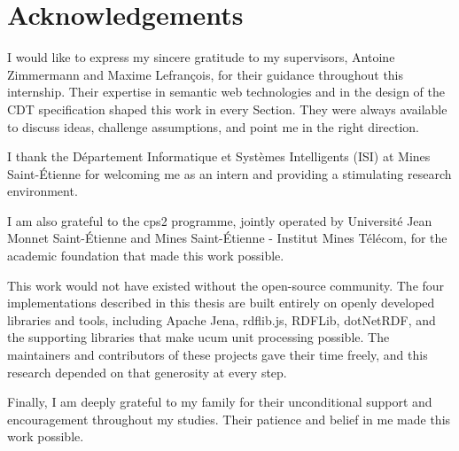 \chapter*{Acknowledgements}

I would like to express my sincere gratitude to my supervisors, Antoine Zimmermann and Maxime Lefrançois, for their guidance throughout this internship. Their expertise in semantic web technologies and in the design of the CDT specification shaped this work in every Section. They were always available to discuss ideas, challenge assumptions, and point me in the right direction.

I thank the Département Informatique et Systèmes Intelligents (ISI) at Mines Saint-Étienne for welcoming me as an intern and providing a stimulating research environment.

I am also grateful to the \ac{cps2} programme, jointly operated by Université Jean Monnet 
Saint-Étienne and Mines Saint-Étienne - Institut Mines Télécom, for the academic foundation 
that made this work possible.

This work would not have existed without the open-source community. The four implementations described in this thesis are built entirely on openly developed libraries and tools, including Apache Jena, rdflib.js, RDFLib, dotNetRDF, and the supporting 
libraries that make \ac{ucum} unit processing possible. The maintainers and contributors of these projects gave their time freely, and this research depended on that generosity at every step.

Finally, I am deeply grateful to my family for their unconditional support and encouragement throughout my studies. Their patience and belief in me made this work possible.

